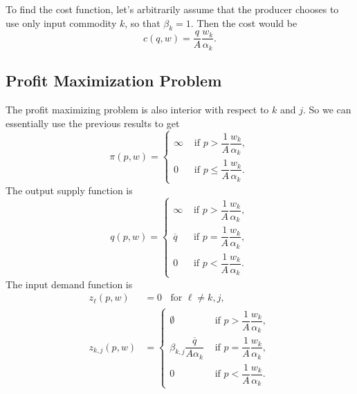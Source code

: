 \documentclass[12pt]{article}
\theoremstyle{definition}
\begin{document}
To find the cost function, let's arbitrarily assume that the producer chooses to use only input commodity $k$, so that $\beta_k=1$. Then the cost would be
	\[c(q,w)= \frac{q}{A} \frac{ w_k}{ \alpha_k}.	\]


\subsection{Profit Maximization Problem}

The profit maximizing problem is also interior with respect to $k$ and $j$. So we can essentially use the previous results to get
\[ \pi(p,w)=
\begin{cases}
	\infty		& \text{ if } p >  \dfrac{1}{A} \dfrac{ w_k}{ \alpha_k},\\[2ex]
	0		& \text{ if } p \leq  \dfrac{1}{A} \dfrac{ w_k}{ \alpha_k}.
\end{cases}
\]
The output supply function is
\[ q(p,w)=
\begin{cases}
	\infty		& \text{ if } p >  \dfrac{1}{A} \dfrac{ w_k}{ \alpha_k},\\[2ex]
	\overline{q}		& \text{ if } p =  \dfrac{1}{A} \dfrac{ w_k}{ \alpha_k},\\[2ex]
	0		& \text{ if } p <  \dfrac{1}{A} \dfrac{ w_k}{ \alpha_k}.
\end{cases}
\]
The input demand function is 
\begin{align*}
	z_{\ell}(p,w) &=0	\;\; \text{ for } \ell \neq k,j,\\
	z_{k,j}(p,w) &=
\begin{cases}
	\emptyset		& \text{ if } p >  \dfrac{1}{A} \dfrac{ w_k}{ \alpha_k},\\[2ex]
	 \beta_{k,j} \dfrac{\overline{q}}{A \alpha_k}		& \text{ if } p =  \dfrac{1}{A} \dfrac{ w_k}{ \alpha_k},\\[2ex]
	0		& \text{ if } p <  \dfrac{1}{A} \dfrac{ w_k}{ \alpha_k}.
\end{cases}
\end{align*}




	
\end{document}
